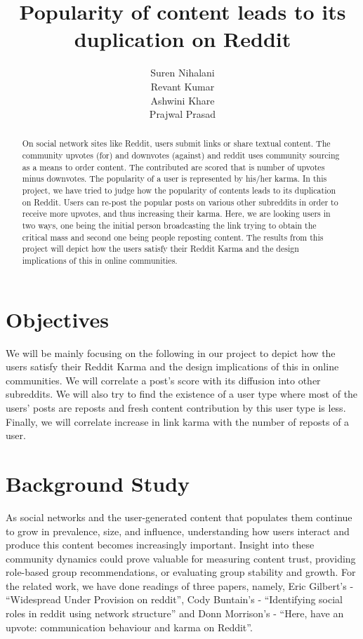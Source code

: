 \documentclass{article} %
\title{Popularity of content leads to its duplication on Reddit}
\author{
Suren Nihalani \\
\And
Revant Kumar \\
\And
Ashwini Khare \\
\And
Prajwal Prasad
}
\begin{document}
\maketitle

\begin{abstract}
On social network sites like Reddit, users submit links or share textual content. The community upvotes (for) and downvotes (against) and reddit uses community sourcing as a means to order content. The contributed are scored that is number of upvotes minus downvotes. The popularity of a user is represented by his/her karma. In this project, we have tried to judge how the popularity of contents leads to its duplication on Reddit. Users can re-post the popular posts on various other subreddits in order to receive more upvotes, and thus increasing their karma. Here, we are looking users in two ways, one being the initial person broadcasting the link trying to obtain the critical mass and second one being people reposting content. The results from this project will depict how the users satisfy their Reddit Karma and the design implications of this in online communities.
\end{abstract}

\section{Objectives}
We will be mainly focusing on the following in our project to depict how the users satisfy their Reddit Karma and the design implications of this in online communities. We will correlate a post's score with its diffusion into other subreddits. We will also try to find the existence of a user type where most of the users' posts are reposts and fresh content contribution by this user type is less. Finally, we will correlate increase in link karma with the number of reposts of a user.

\section{Background Study}

As social networks and the user-generated content that populates them continue to grow in prevalence, size, and influence, understanding how users interact and produce this content becomes increasingly important. Insight into these community dynamics could prove valuable for measuring content trust, providing role-based group recommendations, or evaluating group stability and growth. For the related work, we have done readings of three papers, namely, Eric Gilbert's - ``Widespread Under Provision on reddit'', Cody Buntain's - ``Identifying social roles in reddit using network structure'' and Donn Morrison's - ``Here, have an upvote: communication behaviour and karma on Reddit''.
\end{document}
